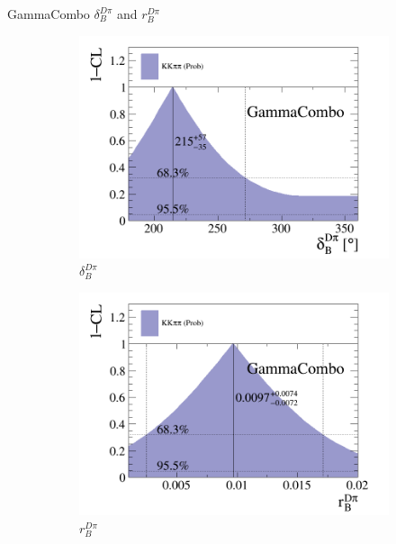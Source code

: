 \documentclass{beamer}
\begin{document}
\begin{frame}{GammaCombo $\delta_B^{D\pi}$ and $r_B^{D\pi}$}
  \begin{figure}[H]
    \centering
    \begin{subfigure}{.5\textwidth}
      \centering
      \includegraphics[width=1\linewidth]{Plots/cartesian_cartesian_d_dpi.png}
      \caption{$\delta_B^{D\pi}$}
    \end{subfigure}%
    \begin{subfigure}{.5\textwidth}
      \centering
      \includegraphics[width=1\linewidth]{Plots/cartesian_cartesian_r_dpi.png}
      \caption{$r_B^{D\pi}$}
    \end{subfigure}
    \caption{}
  \end{figure}
\end{frame}
\end{document}

